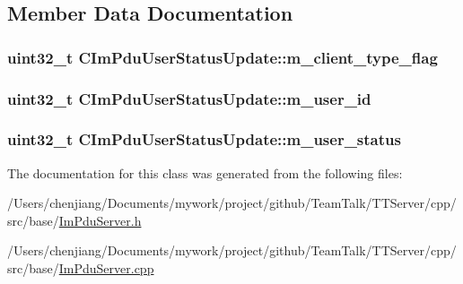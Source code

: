 \subsection{Member Data Documentation}
\hypertarget{class_c_im_pdu_user_status_update_a50b3ef07b4c1c812654449b01c22ff77}{}
\subsubsection[{m\+\_\+client\+\_\+type\+\_\+flag}]{\setlength{\rightskip}{0pt plus 5cm}uint32\+\_\+t C\+Im\+Pdu\+User\+Status\+Update\+::m\+\_\+client\+\_\+type\+\_\+flag\hspace{0.3cm}{\ttfamily [private]}}\label{class_c_im_pdu_user_status_update_a50b3ef07b4c1c812654449b01c22ff77}
\hypertarget{class_c_im_pdu_user_status_update_a63a441923033746647bae0f544023369}{}
\subsubsection[{m\+\_\+user\+\_\+id}]{\setlength{\rightskip}{0pt plus 5cm}uint32\+\_\+t C\+Im\+Pdu\+User\+Status\+Update\+::m\+\_\+user\+\_\+id\hspace{0.3cm}{\ttfamily [private]}}\label{class_c_im_pdu_user_status_update_a63a441923033746647bae0f544023369}
\hypertarget{class_c_im_pdu_user_status_update_a0531f67dadca459394d77eb3c16536df}{}
\subsubsection[{m\+\_\+user\+\_\+status}]{\setlength{\rightskip}{0pt plus 5cm}uint32\+\_\+t C\+Im\+Pdu\+User\+Status\+Update\+::m\+\_\+user\+\_\+status\hspace{0.3cm}{\ttfamily [private]}}\label{class_c_im_pdu_user_status_update_a0531f67dadca459394d77eb3c16536df}


The documentation for this class was generated from the following files\+:\begin{DoxyCompactItemize}
\item 
/\+Users/chenjiang/\+Documents/mywork/project/github/\+Team\+Talk/\+T\+T\+Server/cpp/src/base/\hyperlink{_im_pdu_server_8h}{Im\+Pdu\+Server.\+h}\item 
/\+Users/chenjiang/\+Documents/mywork/project/github/\+Team\+Talk/\+T\+T\+Server/cpp/src/base/\hyperlink{_im_pdu_server_8cpp}{Im\+Pdu\+Server.\+cpp}\end{DoxyCompactItemize}
